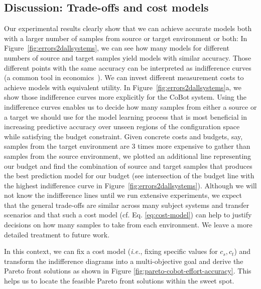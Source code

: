 \subsection{Discussion: Trade-offs and cost models}
Our experimental results clearly show that we can achieve
accurate models both with a larger number of samples from source
or target environment or both:
In Figure~\ref{fig:errors2dallsystems}, we can see how
many models for different numbers of source and target samples
yield models with similar accuracy.
Those different points with the same accuracy can be interpreted
as indifference curves (a common tool in economics~\cite{binger1988microeconomics}).
We can invest different measurement costs to achieve models with
equivalent utility.
In Figure~\ref{fig:errors2dallsystems}a,
we show those indifference curves more explicitly for the CoBot
system. Using the indifference curves enables us to decide how many samples from either a source or a target we should use for the model learning process that is most beneficial in increasing predictive accuracy over unseen regions of the configuration space while satisfying the budget constraint.
Given concrete costs and budgets, say, samples from the target environment are 3 times
more expensive to gather than samples from the source environment,
we plotted an additional line representing our budget and find the
combination of source and target samples that produces the best
prediction model for our budget (see intersection of the budget
line with the highest indifference curve in Figure~\ref{fig:errors2dallsystems}).
Although we will not know the indifference lines until we run
extensive experiments, we expect that the general trade-offs
are similar across many subject systems and transfer scenarios
and that such a cost model (cf. Eq. \ref{eq:cost-model}) can help to justify decisions
on how many samples to take from each environment.
We leave a more detailed treatment to future work.

In this context, we can fix a cost model (\emph{i.e.}, fixing specific values for $c_s,c_t$) and transform the indifference diagrams into a multi-objective goal and derive the Pareto front solutions as shown in Figure \ref{fig:pareto-cobot-effort-accuracy}. This helps us to locate the feasible Pareto front solutions within the sweet spot.

